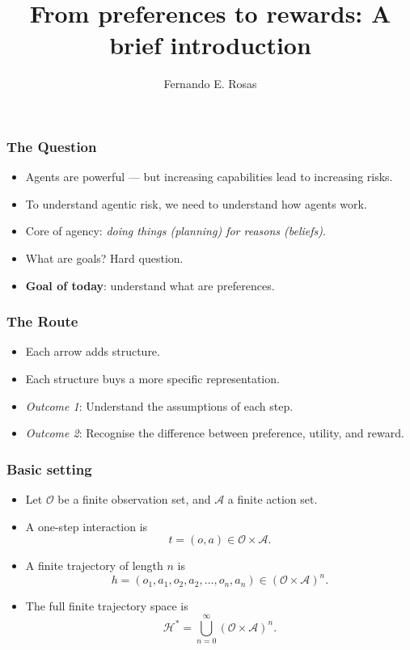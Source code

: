 \documentclass[10pt,a4paper]{beamer}
\title[From preferences to rewards]
{From preferences to rewards: A brief introduction}
\author[F. Rosas]
{Fernando E. Rosas}
\institute[Iliad]
{
  Iliad Intensive
}
\newcommand{\Hcal}{\mathcal{H}}
\newcommand{\Ofin}{\mathcal{O}}
\newcommand{\Afin}{\mathcal{A}}
\begin{document}
\frame{\titlepage}

\begin{frame}
\frametitle{The Question}
\begin{itemize}
    \item Agents are powerful --- but increasing capabilities lead to increasing risks.
    \pause
    \item To understand agentic risk, we need to understand how agents work.
    \pause
    \item Core of agency: \textit{doing things (planning) for reasons (beliefs)}.
    \pause
    \item What are goals? Hard question.
    \pause
    \item \textbf{Goal of today}: understand what are preferences.
\end{itemize}
\end{frame}

\begin{frame}
\frametitle{The Route}
\centering
{}

\vspace{0.65cm}
\begin{itemize}
    \item Each arrow adds structure.
    \pause
    \item Each structure buys a more specific representation.
    \pause
    \item \textit{Outcome 1}: Understand the assumptions of each step.
    \pause
    \item \textit{Outcome 2}: Recognise the difference between preference, utility, and reward.
\end{itemize}
\end{frame}

\begin{frame}
\frametitle{Basic setting}
\begin{itemize}
    \item Let $\Ofin$ be a finite observation set, and $\Afin$ a finite action set.
    \pause
    \item A one-step interaction is
    $$
    t=(o,a)\in \Ofin\times \Afin.
    $$
    \pause
    \item A finite trajectory of length $n$ is
    $$
    h=(o_1,a_1,o_2,a_2,\dots,o_n,a_n)\in(\Ofin\times\Afin)^n.
    $$
    \pause
    \item The full finite trajectory space is
    $$
    \Hcal^*=\bigcup_{n=0}^{\infty}(\Ofin\times\Afin)^n.
    $$
\end{itemize}
\end{frame}
\end{document}
